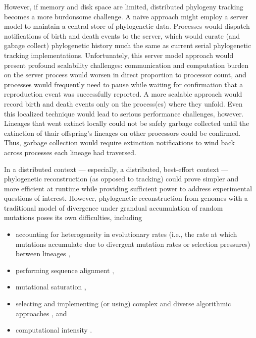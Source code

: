 However, if memory and disk space are limited, distributed phylogeny tracking becomes a more burdonsome challenge.
A naive approach might employ a server model to maintain a central store of phylogenetic data.
Processes would dispatch notifications of birth and death events to the server, which would curate (and gabage collect) phylogenetic history much the same as current serial phylogenetic tracking implementations.
Unfortunately, this server model approach would present profound scalability challenges: communication and computation burden on the server process would worsen in direct proportion to processor count, and processes would frequently need to pause while waiting for confirmation that a reproduction event was successfully reported.
A more scalable approach would record birth and death events only on the process(es) where they unfold.
Even this localized technique would lead to serious performance challenges, however.
Lineages that went extinct locally could not be safely garbage collected until the extinction of thair offspring's lineages on other processors could be confirmed.
Thus, garbage collection would require extinction notifications to wind back across processes each lineage had traversed.


In a distributed context --- especially, a distributed, best-effort context --- phylogenetic reconstruction (as opposed to tracking) could prove simpler and more efficient at runtime while providing sufficient power to address experimental questions of interest.
However, phylogenetic reconstruction from genomes with a traditional model of divergence under grandual accumulation of random mutations poses its own difficulties, including
\begin{itemize}
\item accounting for heterogeneity in evolutionary rates (i.e., the rate at which mutations accumulate due to divergent mutation rates or selection pressures) between lineages \citep{lack2010identifying},
\item performing sequence alignment \citep{casci2008lining},
\item mutational saturation \citep{hagstrom2004using},
\item selecting and implementing (or using) complex and diverse algorithmic approaches \citep{kapli2020phylogenetic}, and
\item computational intensity \citep{sarkar2010hardware}.
\end{itemize}

